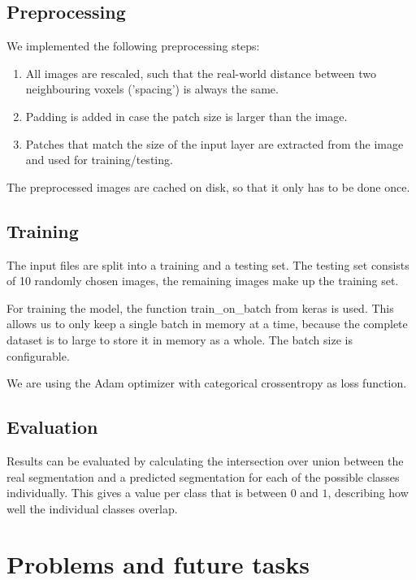 \documentclass{article}
\begin{document}
		\subsection{Preprocessing}

			We implemented the following preprocessing steps:

			\begin{enumerate}
			 	\item All images are rescaled, such that the real-world distance between two neighbouring voxels ('spacing') is always the same.
			 	\item Padding is added in case the patch size is larger than the image.
			 	\item Patches that match the size of the input layer are extracted from the image and used for training/testing.
			\end{enumerate} 

			The preprocessed images are cached on disk, so that it only has to be done once.

		\subsection{Training}

			The input files are split into a training and a testing set. The testing set consists of 10 randomly chosen images, the remaining images make up the training set.

			For training the model, the function train\_on\_batch from keras is used. This allows us to only keep a single batch in memory at a time, because the complete dataset is to large to store it in memory as a whole. The batch size is configurable.

			We are using the Adam optimizer with categorical crossentropy as loss function.

		\subsection{Evaluation}

			Results can be evaluated by calculating the intersection over union between the real segmentation and a predicted segmentation for each of the possible classes individually. This gives a value per class that is between $0$ and $1$, describing how well the individual classes overlap.

	\section{Problems and future tasks}
\end{document}
